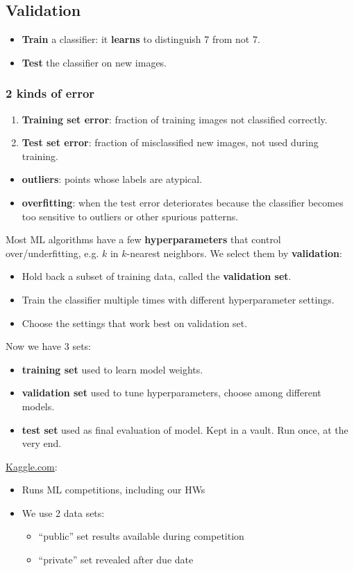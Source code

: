 \documentclass{article}
\begin{document}
\subsection{Validation}
\begin{itemize}
\item \textbf{Train} a classifier: it \textbf{learns} to distinguish 7 from not 7.
\item \textbf{Test} the classifier on new images.
\end{itemize}
\subsubsection{2 kinds of error}
\begin{enumerate}
\item \textbf{Training set error}: fraction of training images not classified correctly.
\item \textbf{Test set error}: fraction of misclassified new images, not used during training.
\end{enumerate}
\begin{itemize}
\item \textbf{outliers}: points whose labels are atypical.
\item \textbf{overfitting}: when the test error deteriorates because the classifier becomes too sensitive to outliers or other spurious patterns.
\end{itemize}
Most ML algorithms have a few \textbf{hyperparameters} that control over/underfitting, e.g. \(k\) in \(k\)-nearest neighbors.  We select them by \textbf{validation}:
\begin{itemize}
\item Hold back a subset of training data, called the \textbf{validation set}.
\item Train the classifier multiple times with different hyperparameter settings.
\item Choose the settings that work best on validation set.
\end{itemize}
Now we have 3 sets:
\begin{itemize}
\item \textbf{training set} used to learn model weights.
\item \textbf{validation set} used to tune hyperparameters, choose among different models.
\item \textbf{test set} used as final evaluation of model. Kept in a vault. Run once, at the very end.
\end{itemize}
\url{Kaggle.com}:
\begin{itemize}
\item Runs ML competitions, including our HWs
\item We use 2 data sets:
\begin{itemize}
\item ``public'' set results available during competition
\item ``private'' set revealed after due date
\end{itemize}
\end{itemize}
\end{document}

